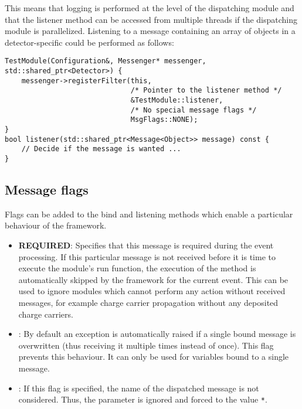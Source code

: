 \begin{enumerate}
This means that logging is performed at the level of the dispatching module and that the listener method can be accessed from multiple threads if the dispatching module is parallelized.
Listening to a message containing an array of objects in a detector-specific  could be performed as follows:
\begin{verbatim}
TestModule(Configuration&, Messenger* messenger, std::shared_ptr<Detector>) {
    messenger->registerFilter(this,
                              /* Pointer to the listener method */
                              &TestModule::listener,
                              /* No special message flags */
                              MsgFlags::NONE);
}
bool listener(std::shared_ptr<Message<Object>> message) const {
    // Decide if the message is wanted ...
}
\end{verbatim}
\end{enumerate}

\subsection{Message flags}
\label{sec:messageflags}
Flags can be added to the bind and listening methods which enable a particular behaviour of the framework.
\begin{itemize}
    \item \textbf{REQUIRED}: Specifies that this message is required during the event processing.
    If this particular message is not received before it is time to execute the module's run function, the execution of the method is automatically skipped by the framework for the current event.
    This can be used to ignore modules which cannot perform any action without received messages, for example charge carrier propagation without any deposited charge carriers.
    \item {}: By default an exception is automatically raised if a single bound message is overwritten (thus receiving it multiple times instead of once).
    This flag prevents this behaviour.
    It can only be used for variables bound to a single message.
    \item {}: If this flag is specified, the name of the dispatched message is not considered.
    Thus, the  parameter is ignored and forced to the value \texttt{*}.
\end{itemize}

